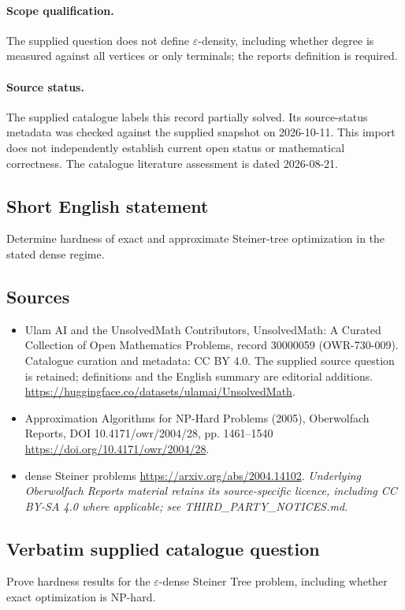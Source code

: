 \documentclass[11pt]{article}
\begin{document}
\paragraph{Scope qualification.}
The supplied question does not define $\varepsilon$-density, including whether degree is measured against all vertices or only terminals; the report\textquotesingle s definition is required.
\paragraph{Source status.}
The supplied catalogue labels this record partially solved. Its source-status metadata was checked against the supplied snapshot on 2026-10-11. This import does not independently establish current open status or mathematical correctness. The catalogue literature assessment is dated 2026-08-21.
\subsection{Short English statement}
Determine hardness of exact and approximate Steiner-tree optimization in the stated dense regime.
\subsection{Sources}
\begin{itemize}
\item[S1] Ulam AI and the UnsolvedMath Contributors, UnsolvedMath: A Curated Collection of Open Mathematics Problems, record 30000059 (OWR-730-009). Catalogue curation and metadata: CC BY 4.0. The supplied source question is retained; definitions and the English summary are editorial additions.
\url{https://huggingface.co/datasets/ulamai/UnsolvedMath}.
\item[S2] Approximation Algorithms for NP-Hard Problems (2005), Oberwolfach Reports, DOI 10.4171/owr/2004/28, pp. 1461--1540
\url{https://doi.org/10.4171/owr/2004/28}.
\item[S3] dense Steiner problems
\url{https://arxiv.org/abs/2004.14102}.
\textit{Underlying Oberwolfach Reports material retains its source-specific licence, including CC BY-SA 4.0 where applicable; see THIRD\_PARTY\_NOTICES.md.}
\end{itemize}
\subsection{Verbatim supplied catalogue question}
Prove hardness results for the $\varepsilon$-dense Steiner Tree problem, including whether exact optimization is NP-hard.
\end{document}
